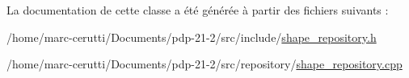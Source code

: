 La documentation de cette classe a été générée à partir des fichiers suivants \+:\begin{DoxyCompactItemize}
\item 
/home/marc-\/cerutti/\+Documents/pdp-\/21-\/2/src/include/\hyperlink{shape__repository_8h}{shape\+\_\+repository.\+h}\item 
/home/marc-\/cerutti/\+Documents/pdp-\/21-\/2/src/repository/\hyperlink{shape__repository_8cpp}{shape\+\_\+repository.\+cpp}\end{DoxyCompactItemize}
